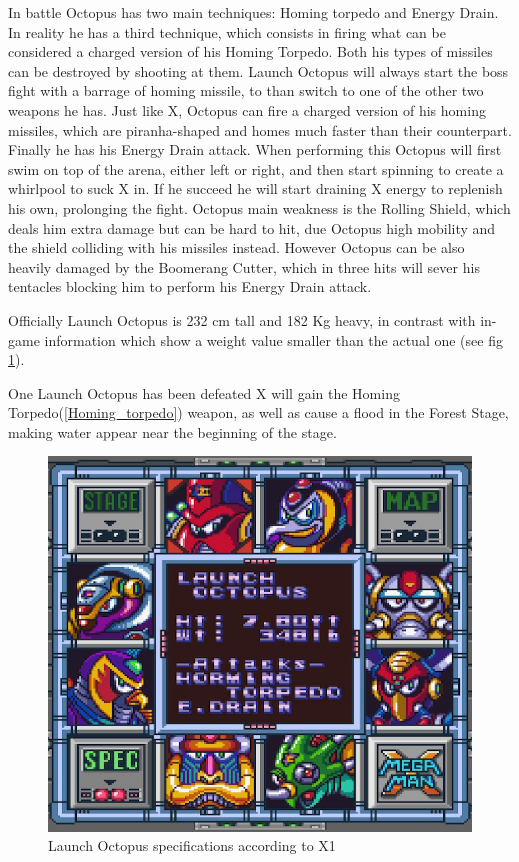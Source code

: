 In battle Octopus has two main techniques: Homing torpedo and Energy Drain. In reality he has a third technique, which consists in firing what can be considered a charged version of his Homing Torpedo. Both his types of missiles can be destroyed by shooting at them. Launch Octopus will always start the boss fight with a barrage of homing missile, to than switch to one of the other two weapons he has. Just like X, Octopus can fire a charged version of his homing missiles, which are piranha-shaped and homes much faster than their counterpart. Finally he has his Energy Drain attack. When performing this Octopus will first swim on top of the arena, either left or right, and then start spinning to create a whirlpool to suck X in. If he succeed he will start draining X energy to replenish his own, prolonging the fight. Octopus main weakness is the Rolling Shield, which deals him extra damage but can be hard to hit, due Octopus high mobility and the shield colliding with his missiles instead. However Octopus can be also heavily damaged by the Boomerang Cutter, which in three hits will sever his tentacles blocking him to perform his Energy Drain attack. 

Officially\cite{wayback:X_resources} Launch Octopus is 232 cm tall and 182 Kg heavy, in contrast with in-game information\cite{wiki:Launch_Octopus} which show a weight value smaller than the actual one (see fig \ref{Octopus_specs}).

One Launch Octopus has been defeated X will gain the Homing Torpedo(\ref{Homing_torpedo}) weapon, as well as cause a flood in the Forest Stage, making water appear near the beginning of the stage.
\begin{figure}[htp]
	\centering
	\includegraphics[width=0.5\linewidth]{figures/X1/Launch_octopus/Launch_octopus_specs.png}
	\caption{Launch Octopus specifications according to X1}
	\label{Octopus_specs}
\end{figure}

